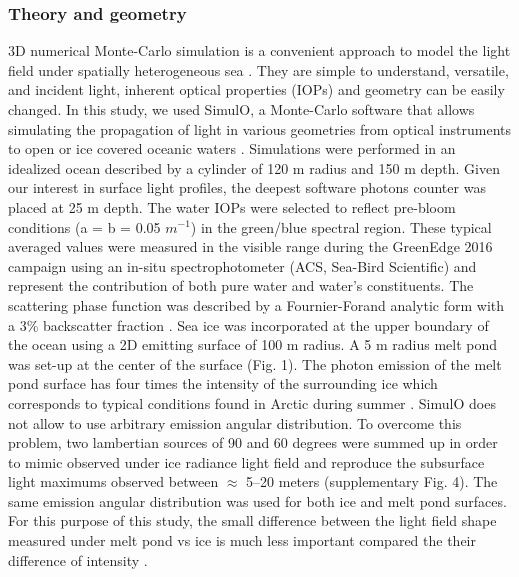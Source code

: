 \subsubsection{Theory and geometry}

3D numerical Monte-Carlo simulation is a convenient approach to model the light field under spatially heterogeneous sea \citep{Mobley_ocean_optics_book, Petrich2012, Katlein2014, Katlein2016}.  They are simple to understand, versatile, and incident light, inherent optical properties (IOPs) and geometry can be easily changed. In this study, we used SimulO, a Monte-Carlo software that allows simulating the propagation of light in various geometries from optical instruments to open or ice covered oceanic waters \citep{Leymarie2010}. Simulations were performed in an idealized ocean described by a cylinder of 120 m radius and 150 m depth. Given our interest in surface light profiles, the deepest software photons counter was placed at 25 m depth. The water IOPs were selected to reflect pre-bloom conditions (a = b = 0.05 $m^{-1}$) in the green/blue spectral region. These typical averaged values were measured in the visible range during the GreenEdge 2016 campaign using an in-situ spectrophotometer (ACS, Sea-Bird Scientific) and represent the contribution of both pure water and water’s constituents. The scattering phase function was described by a Fournier-Forand analytic form with a 3\% backscatter fraction \citep{Fournier1994, Mobley2002}. Sea ice was incorporated at the upper boundary of the ocean using a 2D emitting surface of 100 m radius. A 5 m radius melt pond was set-up at the center of the surface (Fig. 1). The photon emission of the melt pond surface has four times the intensity of the surrounding ice which corresponds to typical conditions found in Arctic during summer \citep{Perovich2016}. SimulO does not allow to use arbitrary  emission angular distribution. To overcome this problem, two lambertian sources of 90 and 60 degrees were summed up in order to mimic observed under ice radiance light field \citep{Girard2018} and reproduce the subsurface light maximums observed between $\approx$ 5--20 meters (supplementary Fig. 4). The same emission angular distribution was used for both ice and melt pond surfaces. For this purpose of this study, the small difference between the light field shape measured under melt pond vs ice is much less important compared the their difference of intensity \citep{Girard2018}.

